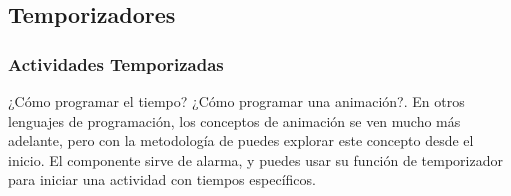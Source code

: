 {{%


\subsection*{Temporizadores}

\subsubsection*{Actividades Temporizadas}

¿Cómo programar el tiempo? ¿Cómo programar una animación?. En otros
lenguajes de programación, los conceptos de animación se ven mucho más
adelante, pero con la metodología de \AppInventor puedes explorar este
concepto desde el inicio. El componente  sirve de
alarma, y puedes usar su función de temporizador para iniciar una
actividad con tiempos específicos.

}}
